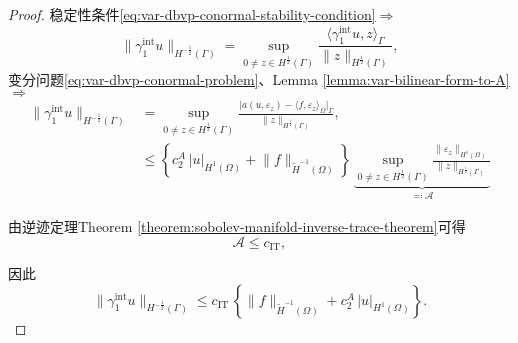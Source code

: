 \begin{proof}
  稳定性条件\eqref{eq:var-dbvp-conormal-stability-condition}$\Rightarrow$
  \begin{equation*}
    \big\| \gamma_1^{\text{int}} u \big\|_{H^{-\frac{1}{2}}(\Gamma)} =
    \sup_{0 \neq z \in H^{\frac{1}{2}}(\Gamma)} \frac{
    \langle \gamma_1^{\text{int}} u , z \rangle_{\Gamma}
    }{
    \big\| z \big\|_{H^{\frac{1}{2}}(\Gamma)}
    },
  \end{equation*}
变分问题\eqref{eq:var-dbvp-conormal-problem}、Lemma \eqref{lemma:var-bilinear-form-to-A}$\Rightarrow$
\begin{equation*}
\begin{split}
  \big\| \gamma_1^{\text{int}} u \big\|_{H^{-\frac{1}{2}}(\Gamma)} &=
  \sup_{0 \neq z \in H^{\frac{1}{2}}(\Gamma)} \frac{
  \big|
  a(u,\varepsilon_z) - \langle f, \varepsilon_z \rangle_{\Omega}
  \big|_{\Gamma}
  }{
  \big\| z \big\|_{H^{\frac{1}{2}}(\Gamma)}
  },\\
  &\le
  \left\{
  c_2^A \, \big| u \big|_{H^{1}(\Omega)} + \big\| f \big\|_{\widetilde{H}^{-1}(\Omega)}
  \right\} \,
  \underbrace{\sup_{0 \neq z \in H^{\frac{1}{2}}(\Gamma)}
  \frac{
  \big\| \varepsilon_z \big\|_{H^{1}(\Omega)}
  }{
  \big\| z \big\|_{H^{\frac{1}{2}}(\Gamma)}
  }}_{\eqqcolon \mathcal{A}}
\end{split}
\end{equation*}

由逆迹定理Theorem \ref{theorem:sobolev-manifold-inverse-trace-theorem}可得
\begin{equation*}
  \mathcal{A} \le c_{\text{IT}},
\end{equation*}

因此
\begin{equation*}
  \big\| \gamma_1^{\text{int}} u \big\|_{H^{-\frac{1}{2}}(\Gamma)}
  \le c_{\text{IT}} \,
    \left\{
    \big\| f \big\|_{\widetilde{H}^{-1}(\Omega)} +
    c_2^A \, \big| u \big|_{H^{1}(\Omega)}
    \right\}.
\end{equation*}
\end{proof}

